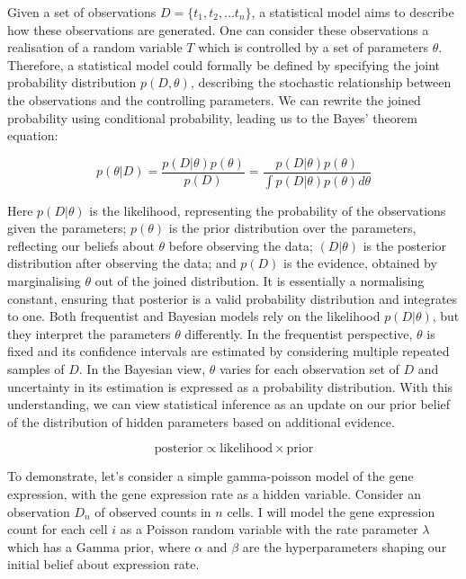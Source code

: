 Given a set of observations ${D} = \{t_1, t_2, … t_n\}$, a statistical model aims to describe how these observations are generated. One can consider these observations a realisation of a random variable $T$ which is controlled by a set of parameters $\theta$. Therefore, a statistical model could formally be defined by specifying the joint probability distribution $p({D}, \theta)$, describing the stochastic relationship between the observations and the controlling parameters. We can rewrite the joined probability using conditional probability, leading us to the Bayes' theorem equation:

\begin{equation}
p(\theta | {D}) = \frac{p({D} | \theta) p(\theta)}{p({D})} = \frac{p({D} | \theta) p(\theta)}{\int p({D} | \theta) p(\theta) d\theta}
\end{equation}

Here $p({D}|\theta)$ is the likelihood, representing the probability of the observations given the parameters; $p(\theta)$ is the prior distribution over the parameters, reflecting our beliefs about $\theta$ before observing the data; $({D}| \theta)$ is the posterior distribution after observing the data; and $p({D})$ is the evidence, obtained by marginalising $\theta$ out of the joined distribution. It is essentially a normalising constant, ensuring that posterior is a valid probability distribution and integrates to one. 
Both frequentist and Bayesian models rely on the likelihood $p({D}|\theta)$, but they interpret the parameters $\theta$ differently. In the frequentist perspective, $\theta$ is fixed and its confidence intervals are estimated by considering multiple repeated samples of ${D}$. In the Bayesian view, $\theta$ varies for each observation set of ${D}$ and uncertainty in its estimation is expressed as a probability distribution. With this understanding, we can view statistical inference as an update on our prior belief of the distribution of hidden parameters based on additional evidence.

\begin{equation}
\text{posterior} \propto \text{likelihood} \times \text{prior}
\end{equation}

To demonstrate, let’s consider a simple gamma-poisson model of the gene expression, with the gene expression rate as a hidden variable. Consider an observation $D_n$  of observed counts in $n$ cells. I will model the gene expression count for each cell $i$ as a $\text{Poisson}$ random variable with the rate parameter $\lambda$ which has a $\text{Gamma}$ prior, where $\alpha$ and $\beta$ are the hyperparameters shaping our initial belief about expression rate.

